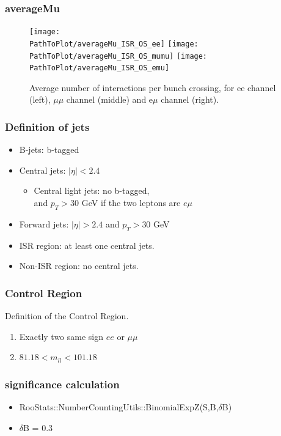\documentclass[mathserif,serif]{beamer}
\begin{document}
\begin{frame}
\frametitle{averageMu}
\begin{figure}
\texttt{[image: \\PathToPlot/averageMu\_ISR\_OS\_ee]}
\texttt{[image: \\PathToPlot/averageMu\_ISR\_OS\_mumu]}
\texttt{[image: \\PathToPlot/averageMu\_ISR\_OS\_emu]} \\
\caption{Average number of interactions per bunch crossing, for ee channel (left), $\mu\mu$ channel (middle) and e$\mu$ channel (right).}
\end{figure}
\end{frame}

\begin{frame}
\frametitle{Definition of jets}
\normalsize
\begin{itemize}
\item B-jets: b-tagged
\item Central jets: $|\eta|<2.4$
\begin{itemize}
\item Central light jets: no b-tagged,\\
and $p_T>30$ GeV if the two leptons are $e\mu$
\end{itemize}
\item Forward jets: $|\eta|>2.4$ and $p_T>30$ GeV
\item ISR region: at least one central jets.
\item Non-ISR region: no central jets.
\end{itemize}
\end{frame}

\begin{frame}
\frametitle{Control Region}
Definition of the Control Region.
\begin{enumerate}
\item Exactly two same sign $ee$ or $\mu\mu$
\item $81.18 < m_{ll} < 101.18$
\end{enumerate}
\end{frame}

\begin{frame}
\frametitle{significance calculation}
\begin{itemize}
\item RooStats::NumberCountingUtils::BinomialExpZ(S,B,$\delta$B)
\item $\delta$B = 0.3
\end{itemize}
\end{frame}
\end{document}
